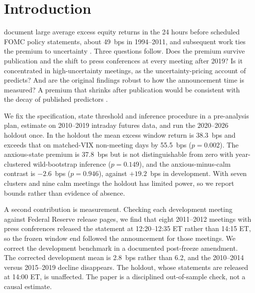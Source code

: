 \section{Introduction}
\citet{lucca2015} document large average excess equity returns in the 24 hours before scheduled FOMC policy statements, about 49~bps in 1994--2011, and subsequent work ties the premium to uncertainty \citep{hu2022,martello2018}. Three questions follow. Does the premium survive publication and the shift to press conferences at every meeting after 2019? Is it concentrated in high-uncertainty meetings, as the uncertainty-pricing account of \citet{hu2022} predicts? And are the original findings robust to how the announcement time is measured? A premium that shrinks after publication would be consistent with the decay of published predictors \citep{mclean2016}.

We fix the specification, state threshold and inference procedure in a pre-analysis plan, estimate on 2010--2019 intraday futures data, and run the 2020--2026 holdout once. In the holdout the mean excess window return is 38.3~bps and exceeds that on matched-VIX non-meeting days by 55.5~bps ($p=0.002$). The anxious-state premium is 37.8~bps but is not distinguishable from zero with year-clustered wild-bootstrap inference ($p=0.149$), and the anxious-minus-calm contrast is $-2.6$~bps ($p=0.946$), against $+19.2$~bps in development. With seven clusters and nine calm meetings the holdout has limited power, so we report bounds rather than evidence of absence.

A second contribution is measurement. Checking each development meeting against Federal Reserve release pages, we find that eight 2011--2012 meetings with press conferences released the statement at 12:20--12:35 ET rather than 14:15 ET, so the frozen window end followed the announcement for those meetings. We correct the development benchmark in a documented post-freeze amendment. The corrected development mean is 2.8~bps rather than 6.2, and the 2010--2014 versus 2015--2019 decline disappears. The holdout, whose statements are released at 14:00 ET, is unaffected. The paper is a disciplined out-of-sample check, not a causal estimate.